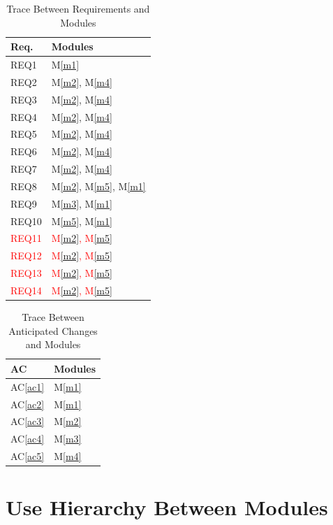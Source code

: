 \documentclass[12pt, titlepage]{article}
\newcommand{\acref}[1]{AC\ref{#1}}
\newcommand{\mref}[1]{M\ref{#1}}
\begin{document}
\begin{table}[H]
\centering
\begin{tabular}{p{} p{}}
\toprule
\textbf{Req.} & \textbf{Modules}\\
\midrule
REQ1 & \mref{m1}\\
REQ2 & \mref{m2}, \mref{m4}\\
REQ3 & \mref{m2}, \mref{m4}\\
REQ4 & \mref{m2}, \mref{m4}\\
REQ5 & \mref{m2}, \mref{m4}\\
REQ6 & \mref{m2}, \mref{m4}\\
REQ7 & \mref{m2}, \mref{m4}\\
REQ8 & \mref{m2}, \mref{m5}, \mref{m1}\\
REQ9 & \mref{m3}, \mref{m1}\\
REQ10 & \mref{m5}, \mref{m1}\\
\textcolor{red}{REQ11} & \textcolor{red}{\mref{m2}, \mref{m5}}\\
\textcolor{red}{REQ12} & \textcolor{red}{\mref{m2}, \mref{m5}}\\
\textcolor{red}{REQ13} & \textcolor{red}{\mref{m2}, \mref{m5}}\\
\textcolor{red}{REQ14} & \textcolor{red}{\mref{m2}, \mref{m5}}\\
\bottomrule
\end{tabular}
\caption{Trace Between Requirements and Modules}
\label{TblRT}
\end{table}

\begin{table}[H]
\centering
\begin{tabular}{p{} p{}}
\toprule
\textbf{AC} & \textbf{Modules}\\
\midrule
\acref{ac1} & \mref{m1}\\
\acref{ac2} & \mref{m1}\\
\acref{ac3} & \mref{m2}\\
\acref{ac4} & \mref{m3}\\
\acref{ac5} & \mref{m4}\\
\bottomrule
\end{tabular}
\caption{Trace Between Anticipated Changes and Modules}
\label{TblACT}
\end{table}

\section{Use Hierarchy Between Modules} \label{SecUse}
\end{document}
